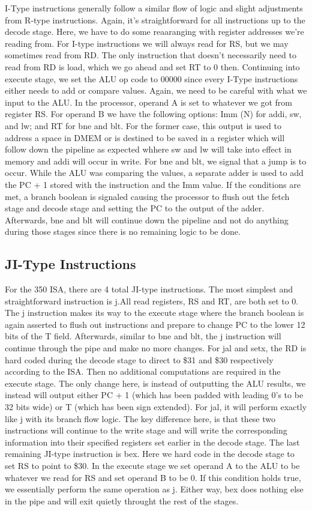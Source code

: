 \documentclass[letterpaper]{article} %
\begin{document}
I-Type instructions generally follow a similar flow of logic and slight adjustments from R-type instructions. Again, it's straightforward for all instructions up to the decode stage. Here, we have to do some reaaranging with register addresses we're reading from. For I-type instructions we will always read for RS, but we may sometimes read from RD. The only instruction that doesn't necessarily need to read from RD is load, which we go ahead and set RT to 0 then. Continuing into execute stage, we set the ALU op code to 00000 since every I-Type instructions either needs to add or compare values. Again, we need to be careful with what we input to the ALU. In the processor, operand A is set to whatever we got from register RS. For operand B we have the following options: Imm (N) for addi, sw, and lw; and RT for bne and blt. For the former case, this output is used to address a space in DMEM or is destined to be saved in a register which will follow down the pipeline as expected whhere sw and lw will take into effect in memory and addi will occur in write. For bne and blt, we signal that a jump is to occur. While the ALU was comparing the values, a separate adder is used to add the PC + 1 stored with the instruction and the Imm value. If the conditions are met, a branch boolean is signaled causing the processor to flush out the fetch stage and decode stage and setting the PC to the output of the adder. Afterwards, bne and blt will continue down the pipeline and not do anything during those stages since there is no remaining logic to be done.

\subsection*{JI-Type Instructions}

For the 350 ISA, there are 4 total JI-type instructions. The most simplest and straightforward instruction is j.All read registers, RS and RT, are both set to 0. The j instruction makes its way to the execute stage where the branch boolean is again asserted to flush out instructions and prepare to change PC to the lower 12 bits of the T field. Afterwards, similar to bne and blt, the j instruction will continue through the pipe and make no more changes. For jal and setx, the RD is hard coded during the decode stage to direct to \$31 and \$30 respectively according to the ISA. Then no additional computations are required in the execute stage. The only change here, is instead of outputting the ALU results, we instead will output either PC + 1 (which has been padded with leading 0's to be 32 bits wide) or T (which has been sign extended). For jal, it will perform exactly like j with its branch flow logic. The key difference here, is that these two instructions will continue to the write stage and will write the corresponding information into their specified registers set earlier in the decode stage. The last remaining JI-type instruction is bex. Here we hard code in the decode stage to set RS to point to \$30. In the execute stage we set operand A to the ALU to be whatever we read for RS and set operand B to be 0. If this condition holds true, we essentially perform the same operation as j. Either way, bex does nothing else in the pipe and will exit quietly throught the rest of the stages.
\end{document}
